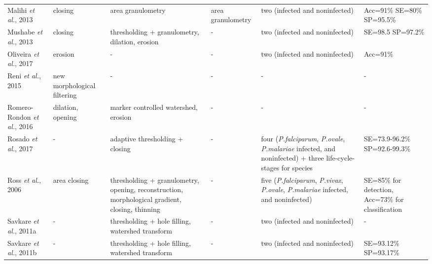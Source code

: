 \begin{longtable}{C{2.1cm} C{2.1cm} C{2.3cm} H C{2.7cm} C{2.2cm} }
    Malihi \emph{et al.}, 2013  &
    	closing &
    	area granulometry  &
    	area granulometry &
    	two (infected and noninfected) &
    	Acc=91\% SE=80\% SP=95.5\% \vspace{0.6cm} \\	

    Mushabe \emph{et al.}, 2013  &
    	closing &
    	thresholding + granulometry, dilation, erosion  &
    	- &
    	two (infected and noninfected) &
    	SE=98.5 SP=97.2\% \vspace{0.6cm} \\	

    Oliveira \emph{et al.}, 2017  &
    	erosion &
    	-  &
    	- &
    	two (infected and noninfected) &
    	Acc=91\% \vspace{0.6cm} \\

    Reni \emph{et al.}, 2015  &
    	new morphological filtering &
    	-  &
    	- &
    	- &
    	- \vspace{0.6cm} \\

    Romero-Rondon \emph{et al.}, 2016  &
    	dilation, opening &
    	marker controlled watershed, erosion  &
    	- &
    	- &
    	- \vspace{0.6cm} \\

    Rosado \emph{et al.}, 2017  &
    	- &
    	adaptive thresholding + closing  &
    	- &
    	four (\emph{P.falciparum}, \emph{P.ovale}, \emph{P.malariae} infected, and noninfected) +
    three life-cycle-stages for species &
    	SE=73.9-96.2\% SP=92.6-99.3\% \vspace{0.6cm} \\

    Ross \emph{et al.}, 2006  &
    	area closing &
    	thresholding + granulometry, opening, reconstruction, morphological gradient, closing, thinning  &
        - &
    	five (\emph{P.falciparum}, \emph{P.vivax}, \emph{P.ovale}, \emph{P.malariae} infected, and noninfected) &
    	SE=85\% for detection, Acc=73\% for classification
    	 \vspace{0.6cm} \\


    Savkare \emph{et al.}, 2011a  &
    	- &
    	thresholding + hole filling, watershed transform  &
    	- &
    	two (infected and noninfected) &
    	- \vspace{0.6cm} \\

    Savkare \emph{et al.}, 2011b  &
    	- &
    	thresholding + hole filling, watershed transform  &
    	- &
    	two (infected and noninfected) &
    	SE=93.12\% SP=93.17\% \vspace{0.6cm} \\


\end{longtable}
